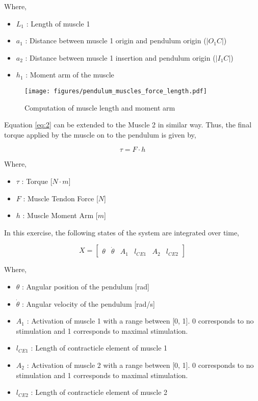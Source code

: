 \documentclass{cmc}
\begin{document}
Where,

\begin{itemize}
\item $L_1$ : Length of muscle 1
\item $a_1$ : Distance between muscle 1 origin and pendulum origin
  ($|O_1C|$)
\item $a_2$ : Distance between muscle 1 insertion and pendulum origin
  ($|I_1C|$)
\item $h_1$ : Moment arm of the muscle
\end{itemize}

\begin{figure}[H]
  \centering
  \texttt{[image: figures/pendulum\_muscles\_force\_length.pdf]}
  \caption[force_length]{Computation of muscle length and moment arm}
  \label{fig:pendulum_muscles_force_length}
\end{figure}

Equation \ref{eq:2} can be extended to the Muscle 2 in similar
way. Thus, the final torque applied by the muscle on to the pendulum
is given by,

\begin{equation}
  \label{eq:3}
  \tau = F \cdot h
\end{equation}

Where,

\begin{itemize}
\item $\tau$ : Torque [$N \cdot m$]
\item $F$ : Muscle Tendon Force [$N$]
\item $h$ : Muscle Moment Arm [$m$]

\end{itemize}

In this exercise, the following states of the system are integrated
over time,

\begin{equation}
  \label{eq:0}
  X = \begin{bmatrix}
    \theta & \dot{\theta} & A_1 & l_{CE1} & A_2 & l_{CE2}
  \end{bmatrix}
\end{equation}

Where,

\begin{itemize}
\item $\theta$ : Angular position of the pendulum [rad]
\item $\dot{\theta}$ : Angular velocity of the pendulum [rad/s]
\item $A_1$ : Activation of muscle 1 with a range between [0, 1].  0
  corresponds to no stimulation and 1 corresponds to maximal
  stimulation.
\item $l_{CE1}$ : Length of contracticle element of muscle 1
\item $A_2$ : Activation of muscle 2 with a range between [0, 1].  0
  corresponds to no stimulation and 1 corresponds to maximal
  stimulation.
\item $l_{CE2}$ : Length of contracticle element of muscle 2
\end{itemize}
\end{document}
